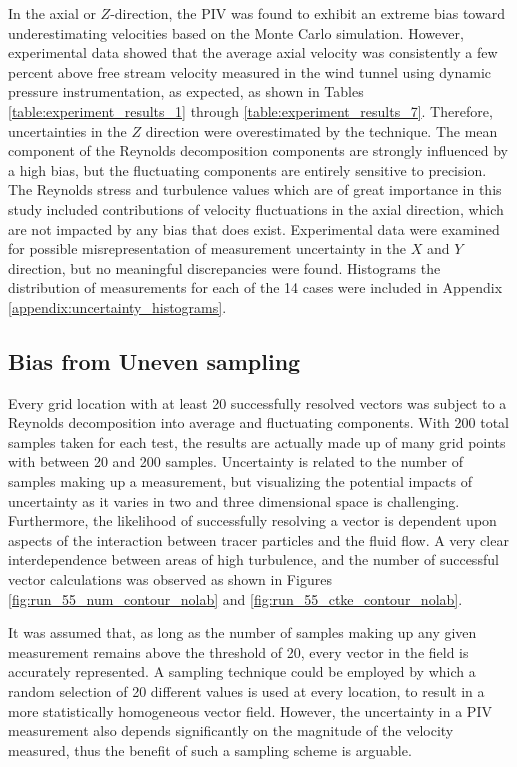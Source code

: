 In the axial or $Z$-direction, the PIV was found to exhibit an extreme bias 
toward underestimating velocities based on the Monte Carlo simulation. However, 
experimental data 
showed that the average axial velocity was consistently a few percent above 
free stream velocity measured in the wind tunnel using dynamic pressure 
instrumentation, as expected, as shown in Tables 
\ref{table:experiment_results_1} through \ref{table:experiment_results_7}. 
Therefore, uncertainties in the $Z$ direction were overestimated by the 
technique. The mean component of the Reynolds decomposition components are 
strongly influenced by a high bias, but the fluctuating components are entirely 
sensitive to precision. The Reynolds stress and turbulence values which are of 
great importance in this study included contributions of velocity fluctuations 
in the axial direction, which are not impacted by any bias that does exist. 
Experimental data were examined for possible misrepresentation of measurement 
uncertainty in the $X$ and $Y$ direction, but no meaningful 
discrepancies were found. Histograms the distribution of measurements for each 
of the 14 cases were included in Appendix \ref{appendix:uncertainty_histograms}.


\subsection{Bias from Uneven sampling}

Every grid location with at least 20 successfully resolved vectors was 
subject to a Reynolds decomposition into average and fluctuating components. 
With 200 total samples taken for each test, the results are actually made up of 
many grid points with between 20 and 200 samples. Uncertainty is related to the 
number of samples making up a measurement, but visualizing the potential 
impacts of uncertainty as it varies in two and three dimensional space is 
challenging. Furthermore, the likelihood of successfully resolving a vector is 
dependent upon aspects of the interaction between tracer particles and the 
fluid flow. A very clear interdependence between areas of high turbulence, and 
the number of successful vector calculations was observed as shown in Figures 
\ref{fig:run_55_num_contour_nolab} and \ref{fig:run_55_ctke_contour_nolab}. 




It was assumed that, as long as the number of samples making up any given 
measurement remains above the threshold of 20, every vector in the field is 
accurately represented. A sampling technique could be employed by 
which a random selection of 20 different values is used at every location, to 
result in a more statistically homogeneous vector field. However, 
the uncertainty in a PIV measurement also depends significantly on the 
magnitude of the velocity measured, thus the benefit of such a sampling scheme 
is arguable.